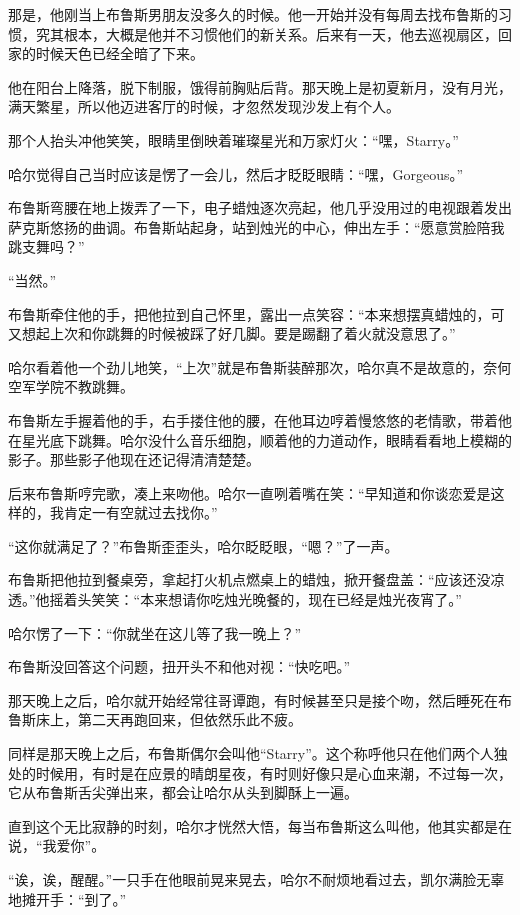 \documentclass[../main]{subfiles}
\begin{document}
那是，他刚当上布鲁斯男朋友没多久的时候。他一开始并没有每周去找布鲁斯的习惯，究其根本，大概是他并不习惯他们的新关系。后来有一天，他去巡视扇区，回家的时候天色已经全暗了下来。

他在阳台上降落，脱下制服，饿得前胸贴后背。那天晚上是初夏新月，没有月光，满天繁星，所以他迈进客厅的时候，才忽然发现沙发上有个人。

那个人抬头冲他笑笑，眼睛里倒映着璀璨星光和万家灯火：“嘿，Starry。”

哈尔觉得自己当时应该是愣了一会儿，然后才眨眨眼睛：“嘿，Gorgeous。”

布鲁斯弯腰在地上拨弄了一下，电子蜡烛逐次亮起，他几乎没用过的电视跟着发出萨克斯悠扬的曲调。布鲁斯站起身，站到烛光的中心，伸出左手：“愿意赏脸陪我跳支舞吗？”

“当然。”

布鲁斯牵住他的手，把他拉到自己怀里，露出一点笑容：“本来想摆真蜡烛的，可又想起上次和你跳舞的时候被踩了好几脚。要是踢翻了着火就没意思了。”

哈尔看着他一个劲儿地笑，“上次”就是布鲁斯装醉那次，哈尔真不是故意的，奈何空军学院不教跳舞。

布鲁斯左手握着他的手，右手搂住他的腰，在他耳边哼着慢悠悠的老情歌，带着他在星光底下跳舞。哈尔没什么音乐细胞，顺着他的力道动作，眼睛看看地上模糊的影子。那些影子他现在还记得清清楚楚。

后来布鲁斯哼完歌，凑上来吻他。哈尔一直咧着嘴在笑：“早知道和你谈恋爱是这样的，我肯定一有空就过去找你。”

“这你就满足了？”布鲁斯歪歪头，哈尔眨眨眼，“嗯？”了一声。

布鲁斯把他拉到餐桌旁，拿起打火机点燃桌上的蜡烛，掀开餐盘盖：“应该还没凉透。”他摇着头笑笑：“本来想请你吃烛光晚餐的，现在已经是烛光夜宵了。”

哈尔愣了一下：“你就坐在这儿等了我一晚上？”

布鲁斯没回答这个问题，扭开头不和他对视：“快吃吧。”

那天晚上之后，哈尔就开始经常往哥谭跑，有时候甚至只是接个吻，然后睡死在布鲁斯床上，第二天再跑回来，但依然乐此不疲。

同样是那天晚上之后，布鲁斯偶尔会叫他“Starry”。这个称呼他只在他们两个人独处的时候用，有时是在应景的晴朗星夜，有时则好像只是心血来潮，不过每一次，它从布鲁斯舌尖弹出来，都会让哈尔从头到脚酥上一遍。

直到这个无比寂静的时刻，哈尔才恍然大悟，每当布鲁斯这么叫他，他其实都是在说，“我爱你”。

“诶，诶，醒醒。”一只手在他眼前晃来晃去，哈尔不耐烦地看过去，凯尔满脸无辜地摊开手：“到了。”
\end{document}
